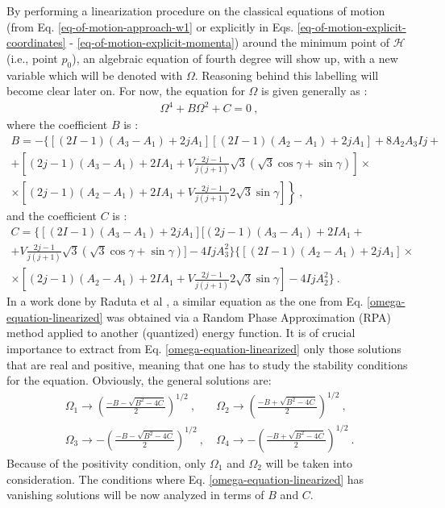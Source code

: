 By performing a linearization procedure on the classical equations of motion (from Eq. \ref{eq-of-motion-approach-w1} or explicitly in Eqs. \ref{eq-of-motion-explicit-coordinates} - \ref{eq-of-motion-explicit-momenta}) around the minimum point of $\mathcal{H}$ (i.e., point $p_0$), an algebraic equation of fourth degree will show up, with a new variable which will be denoted with $\Omega$. Reasoning behind this labelling will become clear later on. For now, the equation for $\Omega$ is given generally as \cite{raduta2020towards}:
\begin{align}
    \Omega^4+B\Omega^2+C=0\ ,
    \label{omega-equation-linearized}
\end{align}
where the coefficient $B$ is \cite{raduta2020approach}:
\begin{multline}
    B=-\bigg\{\left[ (2I-1)(A_3-A_1)+2jA_1\right]\left[(2I-1)(A_2-A_1)+2jA_1\right]+8A_2A_3Ij+\\
    +\left[(2j-1)(A_3-A_1)+2IA_1+V\frac{2j-1}{j(j+1)}\sqrt{3}\left(\sqrt{3}\cos\gamma+\sin\gamma\right)\right]\times\\
    \left.\times\left[(2j-1)(A_2-A_1)+2IA_1+V\frac{2j-1}{j(j+1)}2\sqrt{3}\sin\gamma\right]\right\}\ ,
    \label{omega-B-term}
\end{multline}
and the coefficient $C$ is \cite{raduta2020approach}:
\begin{multline}
    C=\bigg\{\left[(2I-1)(A_3-A_1)+2jA_1\right]\bigg[(2j-1)(A_3-A_1)+2IA_1+\\
    +V\frac{2j-1}{j(j+1)}\sqrt{3}(\sqrt{3}\cos\gamma+\sin\gamma)\bigg]-4IjA_3^2\bigg\}\bigg\{\left[(2I-1)(A_2-A_1)+2jA_1\right]\times\\
    \times\left[(2j-1)(A_2-A_1)+2IA_1+V\frac{2j-1}{j(j+1)}2\sqrt{3}\sin\gamma\right]-4IjA_2^2\bigg\}\ .
    \label{omega-C-term}
\end{multline}
In a work done by Raduta et al \cite{raduta2017semiclassical}, a similar equation as the one from Eq. \ref{omega-equation-linearized} was obtained via a Random Phase Approximation (RPA) method applied to another (quantized) energy function. It is of crucial importance to extract from Eq. \ref{omega-equation-linearized} only those solutions that are real and positive, meaning that one has to study the stability conditions for the equation. Obviously, the general solutions are:
\begin{align}
    \Omega_1 \to \left(\frac{-B-\sqrt{B^2-4 C}}{2}\right)^{1/2}\ ,&\ \Omega_2 \to \left(\frac{-B+\sqrt{B^2-4 C}}{2}\right)^{1/2}\ ,\nonumber\\
    \Omega_3 \to -\left(\frac{-B-\sqrt{B^2-4 C}}{2}\right)^{1/2}\ ,&\ \Omega_4 \to -\left(\frac{-B+\sqrt{B^2-4 C}}{2}\right)^{1/2}\ .
    \label{omega-1-2-3-4-solutions}
\end{align}
Because of the positivity condition, only $\Omega_1$ and $\Omega_2$ will be taken into consideration. The conditions where Eq. \ref{omega-equation-linearized} has vanishing solutions will be now analyzed in terms of $B$ and $C$.

